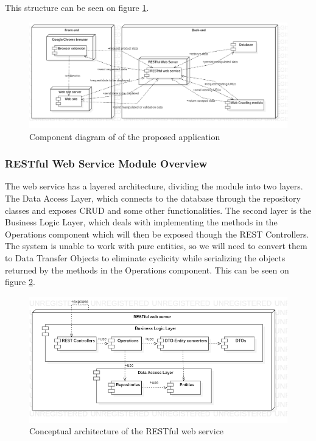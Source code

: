 \documentclass[12pt,a4paper,twoside]{report}
\begin{document}
This structure can be seen on figure \ref{fig:app_component_diagram}.

\begin{figure}[ht]
  \centering
  \includegraphics[width=\linewidth]{img/app_component_diagram_actual.png}
  \caption[]{Component diagram of of the proposed application}
  \label{fig:app_component_diagram}
\end{figure}


\subsubsection{RESTful Web Service Module Overview}

The web service has a layered architecture, dividing the module into two layers. The Data Access Layer, which connects to the database through the repository classes and exposes CRUD and some other functionalities. The second layer is the Business Logic Layer, which deals with implementing the methods in the Operations component which will then be exposed though the REST Controllers. The system is unable to work with pure entities, so we will need to convert them to Data Transfer Objects to eliminate cyclicity while serializing the objects returned by the methods in the Operations component. This can be seen on figure \ref{fig:app_conceptual_architecture_rest}.

\begin{figure}[ht]
  \centering
  \includegraphics[width=0.65\linewidth]{img/app_conceptual_architecture_rest.png}
  \caption[]{Conceptual architecture of the RESTful web service}
  \label{fig:app_conceptual_architecture_rest}
\end{figure}
\end{document}
